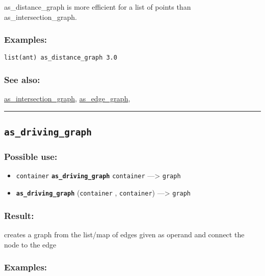 \documentclass[]{book}
\providecommand{\tightlist}{%
  \setlength{\itemsep}{0pt}\setlength{\parskip}{0pt}}
\theoremstyle{definition}
\theoremstyle{definition}
\theoremstyle{definition}
\theoremstyle{remark}
\begin{document}
as\_distance\_graph is more efficient for a list of points than
as\_intersection\_graph.

\subsubsection{Examples:}\label{examples-37}

\begin{verbatim}
list(ant) as_distance_graph 3.0 
\end{verbatim}

\subsubsection{See also:}\label{see-also-30}

\href{operators-a-to-a.html\#as_intersection_graph}{as\_intersection\_graph},
\href{operators-a-to-a.html\#as_edge_graph}{as\_edge\_graph},

\begin{center}\rule{0.5\linewidth}{\linethickness}\end{center}

\subsection{\texorpdfstring{\texttt{as\_driving\_graph}}{as\_driving\_graph}}\label{as_driving_graph}

\subsubsection{Possible use:}\label{possible-use-46}

\begin{itemize}
\tightlist
\item
  \texttt{container} \textbf{\texttt{as\_driving\_graph}}
  \texttt{container} ---\textgreater{} \texttt{graph}
\item
  \textbf{\texttt{as\_driving\_graph}} (\texttt{container} ,
  \texttt{container}) ---\textgreater{} \texttt{graph}
\end{itemize}

\subsubsection{Result:}\label{result-45}

creates a graph from the list/map of edges given as operand and connect
the node to the edge

\subsubsection{Examples:}\label{examples-38}
\end{document}
